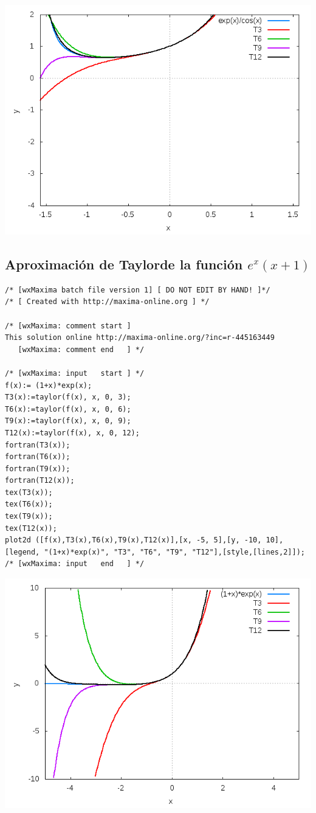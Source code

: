 \documentclass[12pt]{article}
\begin{document}
\begin{center}
\includegraphics[scale=.5]{expcos.png}
\end{center}
\pagebreak
\subsection{Aproximación de Taylorde la función $e^x(x+1)$}

\begin{verbatim}
/* [wxMaxima batch file version 1] [ DO NOT EDIT BY HAND! ]*/
/* [ Created with http://maxima-online.org ] */

/* [wxMaxima: comment start ]
This solution online http://maxima-online.org/?inc=r-445163449
   [wxMaxima: comment end   ] */

/* [wxMaxima: input   start ] */
f(x):= (1+x)*exp(x);
T3(x):=taylor(f(x), x, 0, 3);
T6(x):=taylor(f(x), x, 0, 6);
T9(x):=taylor(f(x), x, 0, 9);
T12(x):=taylor(f(x), x, 0, 12);
fortran(T3(x));
fortran(T6(x));
fortran(T9(x));
fortran(T12(x));
tex(T3(x));
tex(T6(x));
tex(T9(x));
tex(T12(x));
plot2d ([f(x),T3(x),T6(x),T9(x),T12(x)],[x, -5, 5],[y, -10, 10],[legend, "(1+x)*exp(x)", "T3", "T6", "T9", "T12"],[style,[lines,2]]);
/* [wxMaxima: input   end   ] */

\end{verbatim}

\begin{center}
\includegraphics[scale=.5]{1xexp.png}
\end{center}
\end{document}
